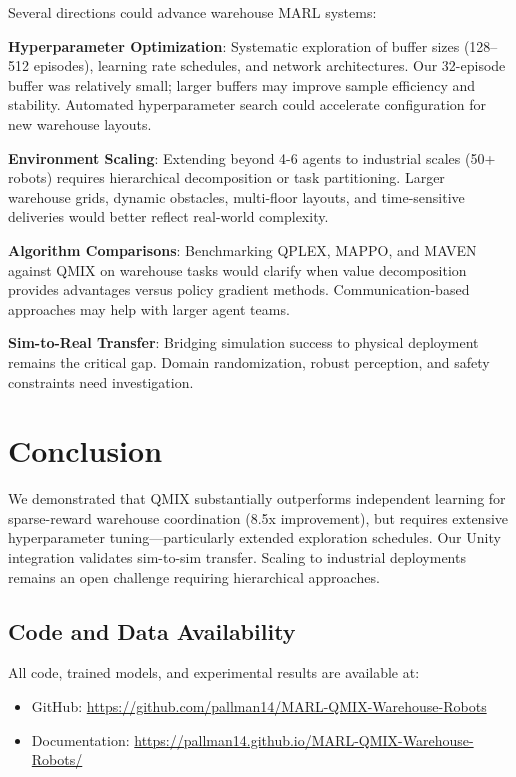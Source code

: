 \documentclass[11pt]{article}
\begin{document}
Several directions could advance warehouse MARL systems:

\textbf{Hyperparameter Optimization}: Systematic exploration of buffer sizes (128--512 episodes), learning rate schedules, and network architectures. Our 32-episode buffer was relatively small; larger buffers may improve sample efficiency and stability. Automated hyperparameter search could accelerate configuration for new warehouse layouts.

\textbf{Environment Scaling}: Extending beyond 4-6 agents to industrial scales (50+ robots) requires hierarchical decomposition or task partitioning. Larger warehouse grids, dynamic obstacles, multi-floor layouts, and time-sensitive deliveries would better reflect real-world complexity.

\textbf{Algorithm Comparisons}: Benchmarking QPLEX, MAPPO, and MAVEN against QMIX on warehouse tasks would clarify when value decomposition provides advantages versus policy gradient methods. Communication-based approaches may help with larger agent teams.

\textbf{Sim-to-Real Transfer}: Bridging simulation success to physical deployment remains the critical gap. Domain randomization, robust perception, and safety constraints need investigation.

\section{Conclusion}

We demonstrated that QMIX substantially outperforms independent learning for sparse-reward warehouse coordination (8.5x improvement), but requires extensive hyperparameter tuning---particularly extended exploration schedules. Our Unity integration validates sim-to-sim transfer. Scaling to industrial deployments remains an open challenge requiring hierarchical approaches.

\subsection*{Code and Data Availability}

All code, trained models, and experimental results are available at:
\begin{itemize}
    \item GitHub: \url{https://github.com/pallman14/MARL-QMIX-Warehouse-Robots}
    \item Documentation: \url{https://pallman14.github.io/MARL-QMIX-Warehouse-Robots/}
\end{itemize}
\end{document}
